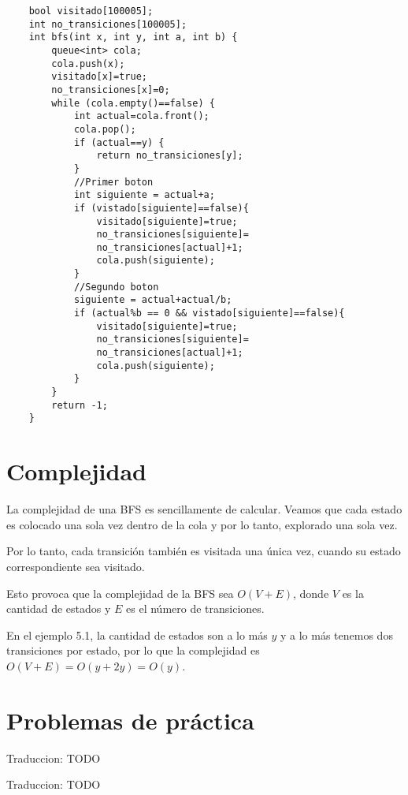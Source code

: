 \begin{minipage}{\linewidth}
\begin{lstlisting}
	bool visitado[100005];
	int no_transiciones[100005];
	int bfs(int x, int y, int a, int b) {
		queue<int> cola;
		cola.push(x);
		visitado[x]=true;
		no_transiciones[x]=0;		
		while (cola.empty()==false) {
			int actual=cola.front();
			cola.pop();
			if (actual==y) {
				return no_transiciones[y];
			}	
			//Primer boton
			int siguiente = actual+a;
			if (vistado[siguiente]==false){
				visitado[siguiente]=true;
				no_transiciones[siguiente]=
				no_transiciones[actual]+1;
				cola.push(siguiente);
			}
			//Segundo boton
			siguiente = actual+actual/b;
			if (actual%b == 0 && vistado[siguiente]==false){
				visitado[siguiente]=true;
				no_transiciones[siguiente]=
				no_transiciones[actual]+1;
				cola.push(siguiente);
			}
		}
		return -1;
	}
\end{lstlisting}
\end{minipage}

\section{Complejidad}
La complejidad de una BFS es sencillamente de calcular. Veamos que cada estado es colocado una sola vez dentro de la cola y por lo tanto, explorado una sola vez.

Por lo tanto, cada transición también es visitada una única vez, cuando su estado correspondiente sea visitado.

Esto provoca que la complejidad de la BFS sea \(O(V+E)\), donde \(V\) es la cantidad de estados y \(E\) es el número de transiciones.

En el ejemplo 5.1, la cantidad de estados son a lo más \(y\) y a lo más tenemos dos transiciones por estado, por lo que la complejidad es \(O(V+E)=O(y+2y)=O(y)\).\\

\section*{Problemas de práctica}

\begin{exercise}
	Traduccion: TODO
\end{exercise}

\begin{exercise}
	Traduccion: TODO
\end{exercise}

\begin{exercise}
\end{exercise}

\begin{exercise}
\end{exercise}